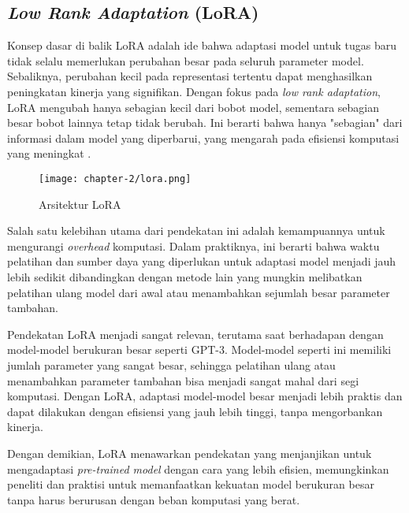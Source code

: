 \subsection{\textit{Low Rank Adaptation} (LoRA)}

Konsep dasar di balik LoRA adalah ide bahwa adaptasi model untuk tugas baru tidak selalu memerlukan perubahan besar pada seluruh parameter model. Sebaliknya, perubahan kecil pada representasi tertentu dapat menghasilkan peningkatan kinerja yang signifikan. Dengan fokus pada \textit{low rank adaptation}, LoRA mengubah hanya sebagian kecil dari bobot model, sementara sebagian besar bobot lainnya tetap tidak berubah. Ini berarti bahwa hanya "sebagian" dari informasi dalam model yang diperbarui, yang mengarah pada efisiensi komputasi yang meningkat \parencite{lora}.

\begin{figure}[ht]
    \centering
    \texttt{[image: chapter-2/lora.png]}
    \caption{Arsitektur LoRA \parencite{lora}}
    \label{fig:lora}
\end{figure}

Salah satu kelebihan utama dari pendekatan ini adalah kemampuannya untuk mengurangi \textit{overhead} komputasi. Dalam praktiknya, ini berarti bahwa waktu pelatihan dan sumber daya yang diperlukan untuk adaptasi model menjadi jauh lebih sedikit dibandingkan dengan metode lain yang mungkin melibatkan pelatihan ulang model dari awal atau menambahkan sejumlah besar parameter tambahan.

Pendekatan LoRA menjadi sangat relevan, terutama saat berhadapan dengan model-model berukuran besar seperti GPT-3. Model-model seperti ini memiliki jumlah parameter yang sangat besar, sehingga pelatihan ulang atau menambahkan parameter tambahan bisa menjadi sangat mahal dari segi komputasi. Dengan LoRA, adaptasi model-model besar menjadi lebih praktis dan dapat dilakukan dengan efisiensi yang jauh lebih tinggi, tanpa mengorbankan kinerja.

Dengan demikian, LoRA menawarkan pendekatan yang menjanjikan untuk mengadaptasi \textit{pre-trained model} dengan cara yang lebih efisien, memungkinkan peneliti dan praktisi untuk memanfaatkan kekuatan model berukuran besar tanpa harus berurusan dengan beban komputasi yang berat.